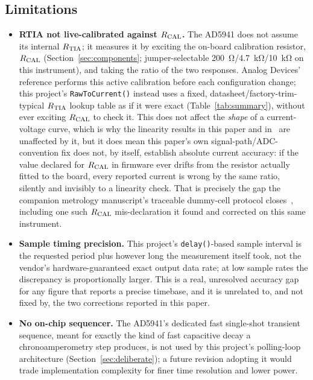 \subsection{Limitations}
\begin{itemize}
\item \textbf{RTIA not live-calibrated against $R_{\mathrm{CAL}}$.} The AD5941 does
  not assume its internal $R_{\mathrm{TIA}}$; it measures it by exciting the
  on-board calibration resistor, $R_{\mathrm{CAL}}$ (Section~\ref{sec:components};
  jumper-selectable \SI{200}{\ohm}/\SI{4.7}{\kilo\ohm}/\SI{10}{\kilo\ohm}
  on this instrument), and taking the ratio of the two responses. Analog
  Devices' reference performs this active calibration before each
  configuration change; this project's \texttt{RawToCurrent()} instead
  uses a fixed, datasheet/factory-trim-typical $R_{\mathrm{TIA}}$ lookup table as if
  it were exact (Table~\ref{tab:summary}), without ever exciting $R_{\mathrm{CAL}}$
  to check it. This does not affect the \emph{shape} of a current-voltage
  curve, which is why the linearity results in this paper
  and in~\cite{clement2026architecture} are unaffected by it, but it does
  mean this paper's own signal-path/ADC-convention fix does not, by
  itself, establish absolute current accuracy: if the value declared for
  $R_{\mathrm{CAL}}$ in firmware ever drifts from the resistor actually fitted to the
  board, every reported current is wrong by the same ratio, silently and
  invisibly to a linearity check. That is precisely the gap the companion
  metrology manuscript's traceable dummy-cell protocol
  closes~\cite{clement2026linearity}, including one such $R_{\mathrm{CAL}}$
  mis-declaration it found and corrected on this same instrument.
\item \textbf{Sample timing precision.} This project's \texttt{delay()}-based
  sample interval is the requested period plus however long the
  measurement itself took, not the vendor's hardware-guaranteed exact
  output data rate; at low sample rates the discrepancy is proportionally
  larger. This is a real, unresolved accuracy gap for any figure that
  reports a precise timebase, and it is unrelated to, and not fixed by,
  the two corrections reported in this paper.
\item \textbf{No on-chip sequencer.} The AD5941's dedicated fast
  single-shot transient sequence, meant for exactly the kind of fast
  capacitive decay a chronoamperometry step produces, is not used by this
  project's polling-loop architecture (Section~\ref{sec:deliberate}); a
  future revision adopting it would trade implementation complexity for
  finer time resolution and lower power.

\end{itemize}
